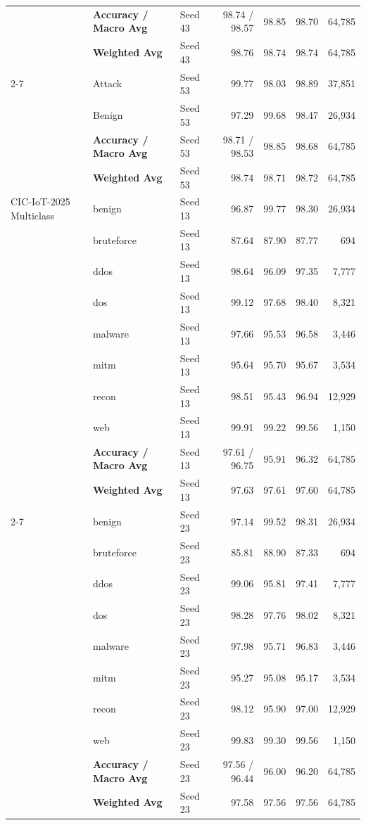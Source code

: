 \documentclass[a4paper,fleqn]{cas-sc}
\begin{document}
{\begin{landscape}
\begin{longtable}{lllrrrr}
 & \textbf{Accuracy / Macro Avg} & Seed 43 & 98.74 / 98.57 & 98.85 & 98.70 & 64,785 \\
 & \textbf{Weighted Avg} & Seed 43 & 98.76 & 98.74 & 98.74 & 64,785 \\
\cline{2-7}
 & Attack & Seed 53 & 99.77 & 98.03 & 98.89 & 37,851 \\
 & Benign & Seed 53 & 97.29 & 99.68 & 98.47 & 26,934 \\
 & \textbf{Accuracy / Macro Avg} & Seed 53 & 98.71 / 98.53 & 98.85 & 98.68 & 64,785 \\
 & \textbf{Weighted Avg} & Seed 53 & 98.74 & 98.71 & 98.72 & 64,785 \\
\midrule
CIC-IoT-2025 Multiclass & benign & Seed 13 & 96.87 & 99.77 & 98.30 & 26,934 \\
 & bruteforce & Seed 13 & 87.64 & 87.90 & 87.77 & 694 \\
 & ddos & Seed 13 & 98.64 & 96.09 & 97.35 & 7,777 \\
 & dos & Seed 13 & 99.12 & 97.68 & 98.40 & 8,321 \\
 & malware & Seed 13 & 97.66 & 95.53 & 96.58 & 3,446 \\
 & mitm & Seed 13 & 95.64 & 95.70 & 95.67 & 3,534 \\
 & recon & Seed 13 & 98.51 & 95.43 & 96.94 & 12,929 \\
 & web & Seed 13 & 99.91 & 99.22 & 99.56 & 1,150 \\
 & \textbf{Accuracy / Macro Avg} & Seed 13 & 97.61 / 96.75 & 95.91 & 96.32 & 64,785 \\
 & \textbf{Weighted Avg} & Seed 13 & 97.63 & 97.61 & 97.60 & 64,785 \\
\cline{2-7}
 & benign & Seed 23 & 97.14 & 99.52 & 98.31 & 26,934 \\
 & bruteforce & Seed 23 & 85.81 & 88.90 & 87.33 & 694 \\
 & ddos & Seed 23 & 99.06 & 95.81 & 97.41 & 7,777 \\
 & dos & Seed 23 & 98.28 & 97.76 & 98.02 & 8,321 \\
 & malware & Seed 23 & 97.98 & 95.71 & 96.83 & 3,446 \\
 & mitm & Seed 23 & 95.27 & 95.08 & 95.17 & 3,534 \\
 & recon & Seed 23 & 98.12 & 95.90 & 97.00 & 12,929 \\
 & web & Seed 23 & 99.83 & 99.30 & 99.56 & 1,150 \\
 & \textbf{Accuracy / Macro Avg} & Seed 23 & 97.56 / 96.44 & 96.00 & 96.20 & 64,785 \\
 & \textbf{Weighted Avg} & Seed 23 & 97.58 & 97.56 & 97.56 & 64,785 \\

\end{longtable}
\end{landscape}}
\end{document}
